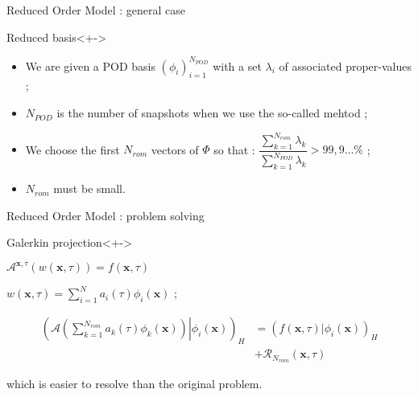 \begin{frame}{Reduced Order Model : general case}
%
\begin{block}{Reduced basis}<+->
\begin{itemize}
\item<+-> We are given a POD basis $(\phi_i)_{i=1}^{N_{POD}}$ with a set $\lambda_i$ of associated proper-values ;
\item<+-> $N_{POD}$ is the number of snapshots when we use the so-called mehtod ;
\item<+-> We choose the first $N_{rom}$ vectors of $\Phi$ so that : $\dfrac{\sum\limits_{k=1}^{N_{rom}}\lambda_k}{\sum\limits_{k=1}^{N_{POD}}\lambda_k} >99,9\dots \%$ ;
\item<+-> $N_{rom}$ must be small.
\end{itemize}
\end{block}
%
\end{frame}

\begin{frame}{Reduced Order Model : problem solving}
\begin{block}{Galerkin projection}<+->
%
\begin{description}
\item<+-> [For a given problem] $\mathcal{A}^{\mathbf{x},\tau}\left(w(\mathbf{x},\tau)\right)=f(\mathbf{x},\tau)$
\item<+-> [Decomposition] $w(\mathbf{x},\tau)=\sum\limits_{i=1}^N a_i(\tau)\phi_i(\mathbf{x})$ ;%
\item<+-> [The problem in $a_k$] %
\[%
\begin{split}
\left(\left.\mathcal{A}\left(\sum\limits_{k=1}^{N_{rom}} a_k(\tau)\phi_k(\mathbf{x})\right) \right|\phi_i\left(\mathbf{x}\right)\right)_H %
&= \left(f\left(\mathbf{x},\tau\right)|\phi_i(\mathbf{x})\right)_H\\%
&+\mathcal{R}_{N_{rom}}(\mathbf{x},\tau)
\end{split}
\]
\item<+-> [\dots] which is easier to resolve than the original problem.
\end{description}
%
\end{block}
%
\end{frame}

